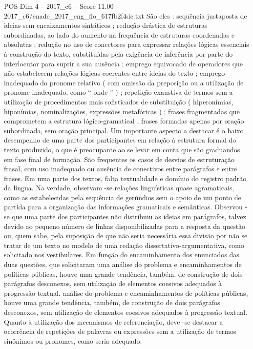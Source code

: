 \begin{textsample}{POS Dim 4 – 2017\_c6 – Score 11.00 – 2017\_c6/enade\_2017\_eng\_flo\_617fb2f4dc.txt}
São eles : sequência justaposta de ideias sem encaixamentos sintáticos ; redução drástica de estruturas subordinadas, ao lado do aumento na frequência de estruturas coordenadas e absolutas ; redução no uso de conectores para expressar relações lógicas essenciais à construção do texto, substituídas pela exigência de inferência por parte do interlocutor para suprir a sua ausência ; emprego equivocado de operadores que não estabelecem relações lógicas coerentes entre ideias do texto ; emprego inadequado do pronome relativo ( com omissão da preposição ou a utilização de pronome inadequado, como “ onde ” ) ; repetição exaustiva de termos sem a utilização de procedimentos mais sofisticados de substituição ( hiperonímias, hiponímias, nominalizações, expressões metafóricas ) ; frases fragmentadas que comprometem a estrutura lógico-gramatical ; frases formadas apenas por oração subordinada, sem oração principal.
Um importante aspecto a destacar é o baixo desempenho de uma parte dos participantes em relação à estrutura formal do texto produzido, o que é preocupante ao se levar em conta que são graduandos em fase final de formação.
São frequentes os casos de desvios de estruturação frasal, com uso inadequado ou ausência de conectivos entre parágrafos e entre frases.
Em uma parte dos textos, falta textualidade e domínio do registro padrão da língua.
Na verdade, observam -se relações linguísticas quase agramaticais, como as estabelecidas pela sequência de gerúndios sem o apoio de um ponto de partida para a organização das informações gramaticais e semânticas.
Observou -se que uma parte dos participantes não distribuiu as ideias em parágrafos, talvez devido ao pequeno número de linhas disponibilizadas para a resposta da questão ou, quem sabe, pela suposição de que não seria necessária essa divisão por não se tratar de um texto no modelo de uma redação dissertativo-argumentativa, como solicitado nos vestibulares.
Em função do encaminhamento dos enunciados das duas questões, que solicitaram uma análise do problema e encaminhamentos de políticas públicas, houve uma grande tendência, também, de construção de dois parágrafos desconexos, sem utilização de elementos coesivos adequados à progressão textual. análise do problema e encaminhamentos de políticas públicas, houve uma grande tendência, também, de construção de dois parágrafos desconexos, sem utilização de elementos coesivos adequados à progressão textual.
Quanto à utilização dos mecanismos de referenciação, deve -se destacar a ocorrência de repetições de palavras ou expressões sem a utilização de termos sinônimos ou pronomes, como seria adequado.

\end{textsample}
